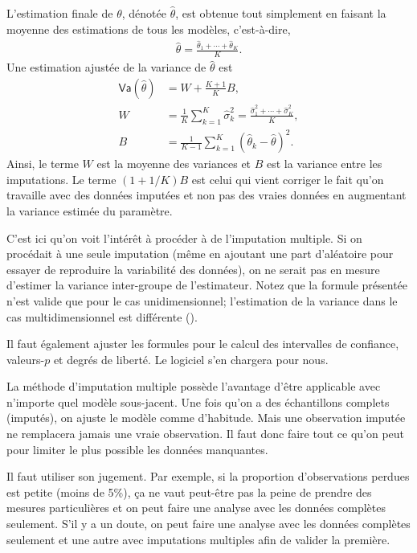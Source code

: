 \documentclass[
  11pt,
  letterpaper,
]{scrbook}
\theoremstyle{definition}
\theoremstyle{remark}
\begin{document}
L'estimation finale de \(\theta\), dénotée \(\widehat{\theta}\), est
obtenue tout simplement en faisant la moyenne des estimations de tous
les modèles, c'est-à-dire, \begin{align*}
\widehat{\theta} = \frac{\widehat{\theta}_1 + \cdots + \widehat{\theta}_K}{K}.
\end{align*} Une estimation ajustée de la variance de
\(\widehat{\theta}\) est \begin{align*}
\mathsf{Va}(\hat{\theta}) &= W+ \frac{K+1}{K}B, 
\\ W &= \frac{1}{K} \sum_{k=1}^K \widehat{\sigma}^2_k = \frac{\widehat{\sigma}_1^2 + \cdots + \widehat{\sigma}_K^2}{K},\\
B &= \frac{1}{K-1} \sum_{k=1}^K (\widehat{\theta}_k - \widehat{\theta})^2.
\end{align*} Ainsi, le terme \(W\) est la moyenne des variances et \(B\)
est la variance entre les imputations. Le terme \((1+1/K)B\) est celui
qui vient corriger le fait qu'on travaille avec des données imputées et
non pas des vraies données en augmentant la variance estimée du
paramètre.

C'est ici qu'on voit l'intérêt à procéder à de l'imputation multiple. Si
on procédait à une seule imputation (même en ajoutant une part
d'aléatoire pour essayer de reproduire la variabilité des données), on
ne serait pas en mesure d'estimer la variance inter-groupe de
l'estimateur. Notez que la formule présentée n'est valide que pour le
cas unidimensionnel; l'estimation de la variance dans le cas
multidimensionnel est différente
().

Il faut également ajuster les formules pour le calcul des intervalles de
confiance, valeurs-\(p\) et degrés de liberté. Le logiciel s'en chargera
pour nous.

La méthode d'imputation multiple possède l'avantage d'être applicable
avec n'importe quel modèle sous-jacent. Une fois qu'on a des
échantillons complets (imputés), on ajuste le modèle comme d'habitude.
Mais une observation imputée ne remplacera jamais une vraie observation.
Il faut donc faire tout ce qu'on peut pour limiter le plus possible les
données manquantes.

Il faut utiliser son jugement. Par exemple, si la proportion
d'observations perdues est petite (moins de 5\%), ça ne vaut peut-être
pas la peine de prendre des mesures particulières et on peut faire une
analyse avec les données complètes seulement. S'il y a un doute, on peut
faire une analyse avec les données complètes seulement et une autre avec
imputations multiples afin de valider la première.
\end{document}
